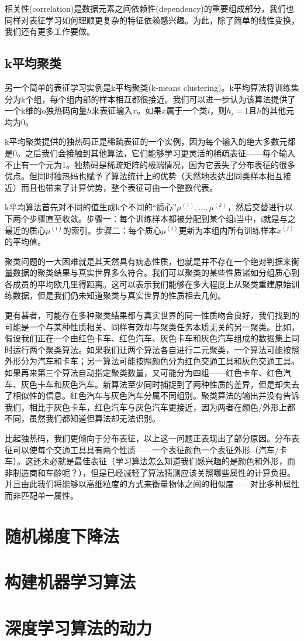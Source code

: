 相关性(correlation)是数据元素之间依赖性(dependency)的重要组成部分，我们也同样对表征学习如何理顺更复杂的特征依赖感兴趣。为此，除了简单的线性变换，我们还有更多工作要做。

\subsection{k平均聚类}
\label{sec:5.8.2}

另一个简单的表征学习实例是k平均聚类(k-means clustering)。k平均算法将训练集分为k个组，每个组内部的样本相互都很接近。我们可以进一步认为该算法提供了一个k维的o独热码向量$h$来表征输入$x$。如果$x$属于一个类$i$，则$h_i=1$且$h$的其他元均为0。

k平均聚类提供的独热码正是稀疏表征的一个实例，因为每个输入的绝大多数元都是0。之后我们会接触到其他算法，它们能够学习更灵活的稀疏表征——每个输入不止有一个元为1。独热码是稀疏矩阵的极端情况，因为它丢失了分布表征的很多优点。但同时独热码也赋予了算法统计上的优势（天然地表达出同类样本相互接近）而且也带来了计算优势，整个表征可由一个整数代表。

k平均算法首先对不同的值生成k个不同的“质心”${\mu^{(1)},...,\mu^{(k)}}$，然后交替进行以下两个步骤直至收敛。步骤一：每个训练样本都被分配到某个组i当中，i就是与之最近的质心$\mu^{(i)}$的索引。步骤二：每个质心$\mu^{(i)}$更新为本组内所有训练样本$x^{(j)}$的平均值。

聚类问题的一大困难就是其天然具有病态性质，也就是并不存在一个绝对判据来衡量数据的聚类结果与真实世界多么符合。我们可以聚类的某些性质诸如分组质心到各成员的平均欧几里得距离。这可以表示我们能够在多大程度上从聚类重建原始训练数据，但是我们仍未知道聚类与真实世界的性质相去几何。

更有甚者，可能存在多种聚类结果都与真实世界的同一性质吻合良好，我们找到的可能是一个与某种性质相关、同样有效却与聚类任务本质无关的另一聚类。比如，假设我们正在一个由红色卡车、红色汽车、灰色卡车和灰色汽车组成的数据集上同时运行两个聚类算法。如果我们让两个算法各自进行二元聚类，一个算法可能按照外形分为汽车和卡车；另一算法可能按照颜色分为红色交通工具和灰色交通工具。如果再来第三个算法自动指定聚类数量，又可能分为四组——红色卡车、红色汽车、灰色卡车和灰色汽车。新算法至少同时捕捉到了两种性质的差异，但是却失去了相似性的信息。红色汽车与灰色汽车分属不同组别。聚类算法的输出并没有告诉我们，相比于灰色卡车，红色汽车与灰色汽车更接近，因为两者在颜色/外形上都不同，虽然我们都知道但算法却无法识别。

比起独热码，我们更倾向于分布表征，以上这一问题正表现出了部分原因。分布表征可以使每个交通工具具有两个性质——一个表征颜色一个表征外形（汽车/卡车）。这还未必就是最佳表征（学习算法怎么知道我们感兴趣的是颜色和外形，而非制造商和车龄呢？），但是已经减轻了算法猜测应该关照哪些属性的计算负担。并且由此我们将能够以高细粒度的方式来衡量物体之间的相似度——对比多种属性而非匹配单一属性。

\section{随机梯度下降法}
\label{sec:5.9}

\section{构建机器学习算法}
\label{sec:5.10}

\section{深度学习算法的动力}
\label{sec:5.11}
